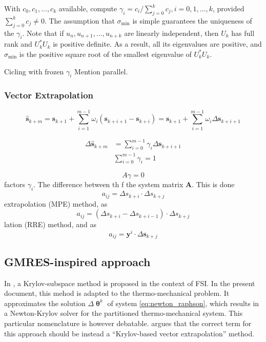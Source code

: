 With \(c_{0}, c_{1}, \ldots, c_{k}\) available, compute \(\gamma_{i}=c_{i} / \sum_{j=0}^{k} c_{j}, i=0,1, \ldots, k\), provided \(\sum_{j=0}^{k} c_{j} \neq 0\). The assumption that \(\sigma_{\min }\) is simple guarantees the uniqueness of the \(\gamma_{i}\).
Note that if \(u_{n}, u_{n+1}, \ldots, u_{n+k}\) are linearly independent, then \(U_{k}\) has full rank and \(U_{k}^{*} U_{k}\) is positive definite. As a result, all its eigenvalues are positive, and \(\sigma_{\min }\) is the positive square root of the smallest eigenvalue of \(U_{k}^{*} U_{k}\).

Cicling with frozen \(\gamma_i\)
Mention parallel.






\subsubsection{Vector Extrapolation}

$$
\hat{\boldsymbol{s}}_{k+m}=\boldsymbol{s}_{k+1}+\sum_{i=1}^{m-1} \omega_{i}\left(\boldsymbol{s}_{k+i+1}-\boldsymbol{s}_{k+i}\right)=\boldsymbol{s}_{k+1}+\sum_{i=1}^{m-1} \omega_{i} \Delta \boldsymbol{s}_{k+i+1}
$$

$$
\begin{aligned}\Delta \hat{\boldsymbol{s}}_{k+m} &=\sum_{i=0}^{m-1} \gamma_{i} \Delta \boldsymbol{s}_{k+i+1} \\& \sum_{i=0}^{m-1} \gamma_{i}=1\end{aligned}
$$

\[
A \gamma=0
\]
factors \(\gamma_{i}\). The difference between th f the system matrix \(\boldsymbol{A}\). This is done
\[
a_{i j}=\Delta s_{k+i} \cdot \Delta s_{k+j}
\]
extrapolation (MPE) method, as
\[
a_{i j}=\left(\Delta s_{k+i}-\Delta s_{k+i-1}\right) \cdot \Delta s_{k+j}
\]
lation (RRE) method, and as
\[
a_{i j}=\boldsymbol{y}^{i} \cdot \Delta \boldsymbol{s}_{k+j}
\]

\subsection{GMRES-inspired approach}

In \cite{michler_interface_2005}, a Krylov-subspace method is proposed in the context of FSI.
In the present document, this mehod is adapted to the thermo-mechanical problem.
It approximates the solution $\Delta \bm{\uptheta}^{k}$ of system \eqref{eq:newton_raphson}, which results in a Newton-Krylov solver for the partitioned thermo-mechanical system.
This particular nomenclature is however debatable.
\cite{kuttler_vector_2009} argues that the correct term for this approach should be instead a “Krylov-based vector extrapolation” method. 

